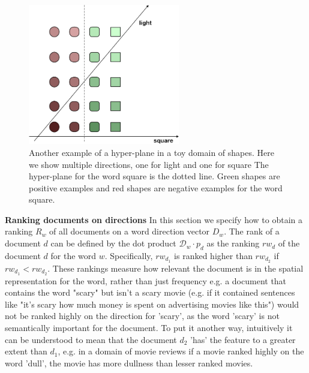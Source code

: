 \begin{figure}[t]
	\includegraphics[width=250px]{images/ToyHyperplane.png}
	\centering
	\caption{Another example of a hyper-plane in a toy domain of shapes. Here we show multiple directions, one for light and one for square The hyper-plane for the word square is the dotted line. Green shapes are positive examples and red shapes are negative examples for the word square. }\label{ch3:ToyHyperPlane}
\end{figure}


\noindent \textbf{Ranking documents on directions} In this section we specify how to obtain a ranking $R_w$ of all documents on a word direction vector $D_w$. The rank of a document $d$ can be defined by the dot product $\mathcal{D}_w \cdot p_d$ as the ranking ${rw}_{d}$ of the document $d$ for the word $w$. Specifically, ${rw}_{d_1}$ is ranked higher than ${rw}_{d_2}$ if  ${rw}_{d_1} < {rw}_{d_2}$. These rankings measure how relevant the document is in the spatial representation for the word, rather than just frequency e.g.  a document that contains the word "scary" but isn't a scary movie (e.g. if it contained sentences like "it's scary how much money is spent on advertising movies like this") would not be ranked highly on the direction for 'scary', as the word 'scary' is not semantically important for the document. To put it another way, intuitively it can be understood to mean that the document $d_2$ 'has' the feature  to a greater extent than $d_1$, e.g. in a domain of movie reviews if a movie ranked highly on the word 'dull', the movie has more dullness than lesser ranked movies. %



